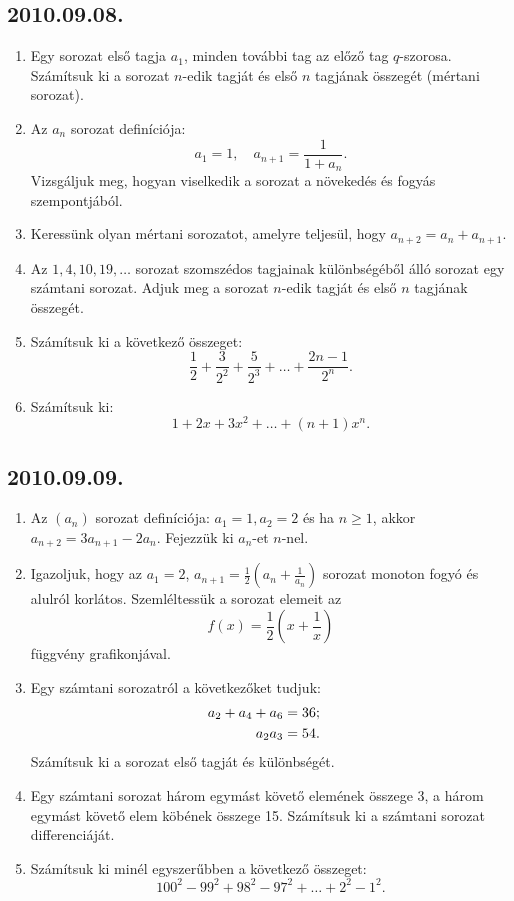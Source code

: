 \documentclass{article}
\begin{document}
\subsection*{2010.09.08.}
\begin{enumerate}
\item Egy sorozat első tagja $a_1$, minden további tag az előző tag $q$-szorosa. Számítsuk ki a sorozat $n$-edik tagját és első $n$ tagjának összegét (mértani sorozat).
\item Az $a_n$ sorozat definíciója:
$$a_1=1,\quad a_{n+1}=\frac{1}{1+a_n}.$$
Vizsgáljuk meg, hogyan viselkedik a sorozat a növekedés és fogyás szempontjából.
\item Keressünk olyan mértani sorozatot, amelyre teljesül, hogy $a_{n+2}=a_n+a_{n+1}$.
\item Az $1,4,10,19,\ldots$ sorozat szomszédos tagjainak különbségéből álló sorozat egy számtani sorozat. Adjuk meg a sorozat $n$-edik tagját és első $n$ tagjának összegét.
\item Számítsuk ki a következő összeget:
$$\frac{1}{2}+\frac{3}{2^2}+\frac{5}{2^3}+\ldots
+\frac{2n-1}{2^n}.$$
\item Számítsuk ki:
$$1+2x+3x^2+\ldots+(n+1)x^n.$$
\end{enumerate}


\subsection*{2010.09.09.}
\begin{enumerate}
\item Az $(a_n)$ sorozat definíciója: $a_1=1, a_2=2$ és ha $n\ge 1$, akkor $a_{n+2}=3a_{n+1}-2a_n$. Fejezzük ki $a_n$-et $n$-nel.
\item Igazoljuk, hogy az $a_1=2$, $a_{n+1}=\frac{1}{2}\left(a_n+\frac{1}{a_n}\right)$ sorozat monoton fogyó és alulról korlátos. Szemléltessük a sorozat elemeit az 
$$f(x)=\frac{1}{2}\left(x+\frac{1}{x}\right)$$
függvény grafikonjával.
\item Egy számtani sorozatról a következőket tudjuk:
\begin{align*}
a_2+a_4+a_6&=36;\cr
a_2a_3&=54.
\end{align*}
Számítsuk ki a sorozat első tagját és különbségét.
\item Egy számtani sorozat három egymást követő elemének összege 3, a három egymást követő elem köbének összege 15. Számítsuk ki a számtani sorozat differenciáját.
\item Számítsuk ki minél egyszerűbben a következő összeget:
$$100^2-99^2+98^2-97^2+\ldots+2^2-1^2.$$
\end{enumerate}
\end{document}
